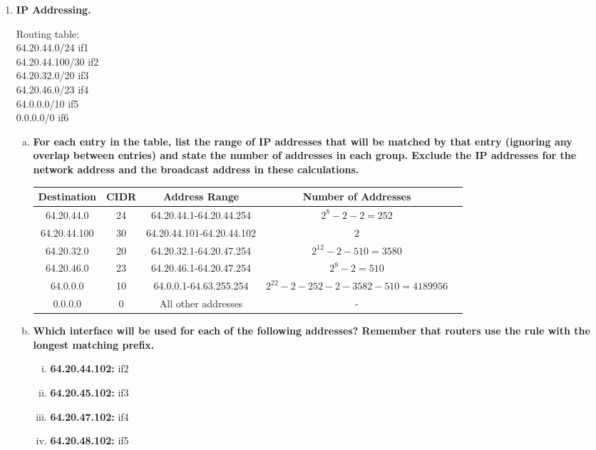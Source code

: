 \documentclass[11pt]{article}
\begin{document}
\begin{enumerate}[1.]
  \item %
  \textbf{
    IP Addressing. 
  } 

  Routing table: \\
  64.20.44.0/24 if1 \\
  64.20.44.100/30 if2 \\
  64.20.32.0/20 if3 \\
  64.20.46.0/23 if4 \\
  64.0.0.0/10 if5 \\
  0.0.0.0/0 if6 

    \begin{enumerate}[a.]
      \item \textbf{
        For each entry in the table, list the range of IP addresses that will be matched by that entry (ignoring any overlap between entries) and state the number of addresses in each group. Exclude the IP addresses for the network address and the broadcast address in these calculations. 
      } \\

      \begin{tabular}{|c|c|c|c|c|}
      \hline
      Destination & CIDR & Address Range & Number of Addresses \\
      \hline
      64.20.44.0    & 24 & 64.20.44.1-64.20.44.254    & $2^8-2-2 = 252$ \\
      64.20.44.100  & 30 & 64.20.44.101-64.20.44.102  & $2$ \\
      64.20.32.0    & 20 & 64.20.32.1-64.20.47.254    & $2^{12} - 2 - 510 = 3580$ \\
      64.20.46.0    & 23 & 64.20.46.1-64.20.47.254    & $2^9 - 2 = 510$\\
      64.0.0.0      & 10 & 64.0.0.1-64.63.255.254     & $2^{22}-2-252-2-3582-510=4189956$ \\
      0.0.0.0       & 0  & All other addresses   & - \\
      \hline
      \end{tabular}
      \item \textbf{
        Which interface will be used for each of the following addresses? Remember that routers use the rule with the longest matching prefix. 
      }
        \begin{enumerate}[i.]
          \item \textbf{64.20.44.102:} if2 
          \item \textbf{64.20.45.102:} if3
          \item \textbf{64.20.47.102:} if4
          \item \textbf{64.20.48.102:} if5
        \end{enumerate}
    \end{enumerate}
    \newpage


\end{enumerate}
\end{document}
